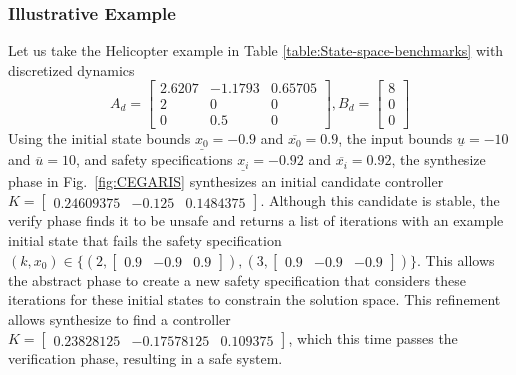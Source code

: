 \documentclass[runningheads,a4paper]{llncs}
\begin{document}
\subsubsection{Illustrative Example}
%
Let us take the Helicopter example in Table \ref{table:State-space-benchmarks} with discretized dynamics
$$A_d = \left[\begin{array}{ccc}2.6207&-1.1793&0.65705\\2&0&0\\0&0.5&0\end{array}\right], B_d = \left [\begin{array}{c}8\\0\\0\end{array}\right]$$
Using the initial state bounds $\underline{x_{0}}=-0.9$ and $\overline{x_{0}}=0.9$, the input bounds $\underline{u}=-10$ and $\overline{u}=10$, and safety specifications 
$\underline{x_{i}}=-0.92$ and $\overline{x_{i}}=0.92$, the {\sc synthesize} phase in Fig.~\ref{fig:CEGARIS} synthesizes an initial candidate controller $K=[\begin{array}{ccc}0.24609375&-0.125&0.1484375\end{array}]$.
Although this candidate is stable, the {\sc verify} phase finds it to be unsafe and returns a list of iterations with an example initial state that fails the safety specification
$(k,x_0) \in \{ (2, [\begin{array}{ccc}0.9&-0.9&0.9\end{array}]), (3, [\begin{array}{ccc}0.9&-0.9&-0.9\end{array}])\}$.
This allows the {\sc abstract} phase to create a new safety specification that considers these iterations for these initial states to constrain the solution space.
This refinement allows {\sc synthesize} to find a controller $K=[\begin{array}{ccc}0.23828125&-0.17578125&0.109375\end{array}]$, which this time passes the verification phase, resulting in a safe system.

\end{document}
